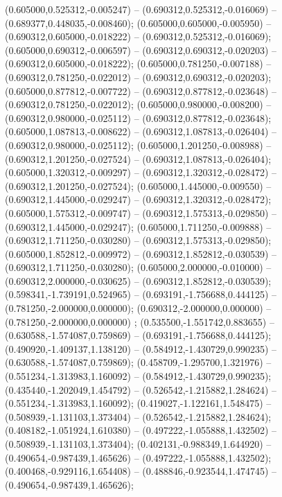  (0.605000,0.525312,-0.005247) -- (0.690312,0.525312,-0.016069) -- (0.689377,0.448035,-0.008460);
 (0.605000,0.605000,-0.005950) -- (0.690312,0.605000,-0.018222) -- (0.690312,0.525312,-0.016069);
 (0.605000,0.690312,-0.006597) -- (0.690312,0.690312,-0.020203) -- (0.690312,0.605000,-0.018222);
 (0.605000,0.781250,-0.007188) -- (0.690312,0.781250,-0.022012) -- (0.690312,0.690312,-0.020203);
 (0.605000,0.877812,-0.007722) -- (0.690312,0.877812,-0.023648) -- (0.690312,0.781250,-0.022012);
 (0.605000,0.980000,-0.008200) -- (0.690312,0.980000,-0.025112) -- (0.690312,0.877812,-0.023648);
 (0.605000,1.087813,-0.008622) -- (0.690312,1.087813,-0.026404) -- (0.690312,0.980000,-0.025112);
 (0.605000,1.201250,-0.008988) -- (0.690312,1.201250,-0.027524) -- (0.690312,1.087813,-0.026404);
 (0.605000,1.320312,-0.009297) -- (0.690312,1.320312,-0.028472) -- (0.690312,1.201250,-0.027524);
 (0.605000,1.445000,-0.009550) -- (0.690312,1.445000,-0.029247) -- (0.690312,1.320312,-0.028472);
 (0.605000,1.575312,-0.009747) -- (0.690312,1.575313,-0.029850) -- (0.690312,1.445000,-0.029247);
 (0.605000,1.711250,-0.009888) -- (0.690312,1.711250,-0.030280) -- (0.690312,1.575313,-0.029850);
 (0.605000,1.852812,-0.009972) -- (0.690312,1.852812,-0.030539) -- (0.690312,1.711250,-0.030280);
 (0.605000,2.000000,-0.010000) -- (0.690312,2.000000,-0.030625) -- (0.690312,1.852812,-0.030539);
 (0.598341,-1.739191,0.524965) -- (0.693191,-1.756688,0.444125) -- (0.781250,-2.000000,0.000000);
 (0.690312,-2.000000,0.000000) -- (0.781250,-2.000000,0.000000) ;
 (0.535500,-1.551742,0.883655) -- (0.630588,-1.574087,0.759869) -- (0.693191,-1.756688,0.444125);
 (0.490920,-1.409137,1.138120) -- (0.584912,-1.430729,0.990235) -- (0.630588,-1.574087,0.759869);
 (0.458709,-1.295700,1.321976) -- (0.551234,-1.313983,1.160092) -- (0.584912,-1.430729,0.990235);
 (0.435440,-1.202049,1.454792) -- (0.526542,-1.215882,1.284624) -- (0.551234,-1.313983,1.160092);
 (0.419027,-1.122161,1.548475) -- (0.508939,-1.131103,1.373404) -- (0.526542,-1.215882,1.284624);
 (0.408182,-1.051924,1.610380) -- (0.497222,-1.055888,1.432502) -- (0.508939,-1.131103,1.373404);
 (0.402131,-0.988349,1.644920) -- (0.490654,-0.987439,1.465626) -- (0.497222,-1.055888,1.432502);
 (0.400468,-0.929116,1.654408) -- (0.488846,-0.923544,1.474745) -- (0.490654,-0.987439,1.465626);
